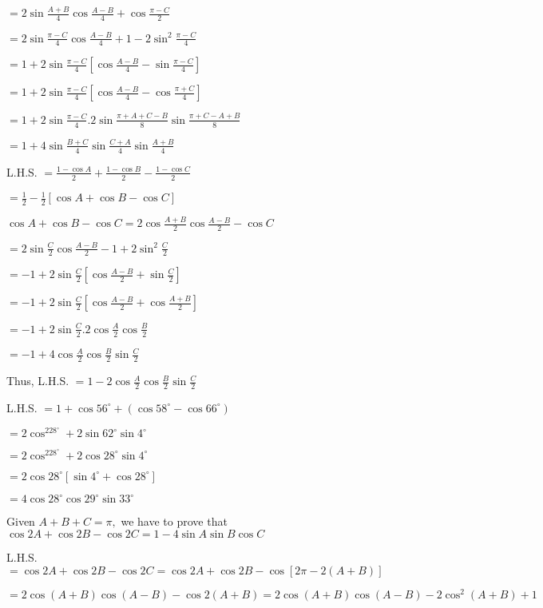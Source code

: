   $= 2\sin\frac{A + B}{4}\cos\frac{A - B}{4} + \cos\frac{\pi - C}{2}$

  $= 2\sin\frac{\pi - C}{4}\cos\frac{A - B}{4} + 1 - 2\sin^2\frac{\pi - C}{4}$

  $=1 + 2\sin\frac{\pi - C}{4}\left[\cos\frac{A - B}{4} - \sin\frac{\pi - C}{4}\right]$

  $= 1 + 2\sin\frac{\pi - C}{4}\left[\cos\frac{A - B}{4} - \cos\frac{\pi + C}{4}\right]$

  $= 1 + 2\sin\frac{\pi - C}{4}.2\sin\frac{\pi + A + C - B}{8}\sin\frac{\pi + C - A + B}{8}$

  $= 1 + 4\sin \frac{B + C}{4}\sin \frac{C + A}{4}\sin \frac{A + B}{4}$

\item L.H.S. $= \frac{1 - \cos A}{2} + \frac{1 - \cos B}{2} - \frac{1 - \cos C}{2}$

  $= \frac{1}{2} - \frac{1}{2}[\cos A + \cos B - \cos C]$

  $\cos A + \cos B - \cos C = 2\cos\frac{A + B}{2}\cos\frac{A - B}{2} - \cos C$

  $= 2\sin\frac{C}{2}\cos\frac{A - B}{2} - 1 + 2\sin^2\frac{C}{2}$

  $= -1 + 2\sin\frac{C}{2}\left[\cos\frac{A - B}{2} + \sin\frac{C}{2}\right]$

  $= -1 + 2\sin\frac{C}{2}\left[\cos\frac{A - B}{2} + \cos\frac{A + B}{2}\right]$

  $= -1 + 2\sin\frac{C}{2}.2\cos\frac{A}{2}\cos\frac{B}{2}$

  $= -1 + 4\cos\frac{A}{2}\cos\frac{B}{2}\sin\frac{C}{2}$

  Thus, L.H.S. $= 1 - 2\cos\frac{A}{2}\cos\frac{B}{2}\sin\frac{C}{2}$

\item L.H.S. $= 1 + \cos56^\circ + (\cos58^\circ - \cos66^\circ)$

  $= 2\cos^228^\circ + 2\sin62^\circ\sin4^\circ$

  $=2\cos^228^\circ + 2\cos28^\circ\sin4^\circ$

  $= 2\cos28^\circ[\sin4^\circ + \cos28^\circ]$

  $= 4\cos28^\circ\cos29^\circ\sin33^\circ$

\item Given $A + B + C = \pi,$ we have to prove that $\cos 2A + \cos 2B - \cos 2C = 1 - 4\sin A\sin B\cos C$

  L.H.S. $=\cos 2A + \cos 2B - \cos 2C = \cos 2A + \cos 2B - \cos[2\pi - 2(A + B)]$

  $= 2\cos(A + B)\cos(A - B) - \cos2(A + B) = 2\cos(A + B)\cos(A - B) - 2\cos^2(A + B) + 1$

